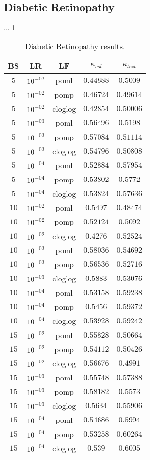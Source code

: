 \documentclass[10pt, a4paper, titlepage]{article}
\begin{document}
\begin{multicols}{2}
	\subsection{Diabetic Retinopathy}
	... \ref{table:DRresults}
	
	\begin{table}[H]
		\footnotesize
		\centering
		\begin{tabular}{ccc|cc}
			BS & LR & LF & $\kappa_{val}$ & $\kappa_{test}$\\\hline
			$5$ & $10^{-02}$ & poml & $0.44888$ & $0.5009$\\
			$5$ & $10^{-02}$ & pomp & $0.46724$ & $0.49614$\\
			$5$ & $10^{-02}$ & cloglog & $0.42854$ & $0.50006$\\
			$5$ & $10^{-03}$ & poml & $0.56496$ & $0.5198$\\
			$5$ & $10^{-03}$ & pomp & $0.57084$ & $0.51114$\\
			$5$ & $10^{-03}$ & cloglog & $0.54796$ & $0.50808$\\
			$5$ & $10^{-04}$ & poml & $0.52884$ & $0.57954$\\
			$5$ & $10^{-04}$ & pomp & $0.53802$ & $0.5772$\\
			$5$ & $10^{-04}$ & cloglog & $0.53824$ & $0.57636$\\
			$10$ & $10^{-02}$ & poml & $0.5497$ & $0.48474$\\
			$10$ & $10^{-02}$ & pomp & $0.52124$ & $0.5092$\\
			$10$ & $10^{-02}$ & cloglog & $0.4276$ & $0.52524$\\
			$10$ & $10^{-03}$ & poml & $0.58036$ & $0.54692$\\
			$10$ & $10^{-03}$ & pomp & $0.56536$ & $0.52716$\\
			$10$ & $10^{-03}$ & cloglog & $0.5883$ & $0.53076$\\
			$10$ & $10^{-04}$ & poml & $0.53158$ & $0.59238$\\
			$10$ & $10^{-04}$ & pomp & $0.5456$ & $0.59372$\\
			$10$ & $10^{-04}$ & cloglog & $0.53928$ & $0.59242$\\
			$15$ & $10^{-02}$ & poml & $0.55828$ & $0.50664$\\
			$15$ & $10^{-02}$ & pomp & $0.54112$ & $0.50426$\\
			$15$ & $10^{-02}$ & cloglog & $0.56676$ & $0.4991$\\
			$15$ & $10^{-03}$ & poml & $0.55748$ & $0.57388$\\
			$15$ & $10^{-03}$ & pomp & $0.58182$ & $0.5573$\\
			$15$ & $10^{-03}$ & cloglog & $0.5634$ & $0.55906$\\
			$15$ & $10^{-04}$ & poml & $0.54686$ & $0.5994$\\
			$15$ & $10^{-04}$ & pomp & $0.53258$ & $0.60264$\\
			$15$ & $10^{-04}$ & cloglog & $0.539$ & $0.6005$
		\end{tabular}
		\caption{Diabetic Retinopathy results.}
		\label{table:DRresults}
	\end{table}
	

\end{multicols}
\end{document}
